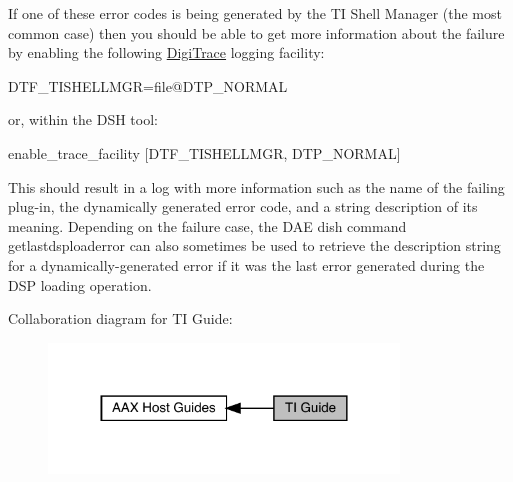If one of these error codes is being generated by the TI Shell Manager (the most common case) then you should be able to get more information about the failure by enabling the following \mbox{\hyperlink{a00834}{Digi\+Trace}} logging facility\+:

{\ttfamily D\+T\+F\+\_\+\+T\+I\+S\+H\+E\+L\+L\+M\+GR=file@D\+T\+P\+\_\+\+N\+O\+R\+M\+AL}

or, within the D\+SH tool\+:

{\ttfamily enable\+\_\+trace\+\_\+facility \mbox{[}D\+T\+F\+\_\+\+T\+I\+S\+H\+E\+L\+L\+M\+GR, D\+T\+P\+\_\+\+N\+O\+R\+M\+AL\mbox{]}}

This should result in a log with more information such as the name of the failing plug-\/in, the dynamically generated error code, and a string description of its meaning. Depending on the failure case, the D\+AE dish command {\ttfamily getlastdsploaderror} can also sometimes be used to retrieve the description string for a dynamically-\/generated error if it was the last error generated during the D\+SP loading operation.

 Collaboration diagram for TI Guide\+:
\nopagebreak
\begin{figure}[H]
\begin{center}
\leavevmode
\includegraphics[width=264pt]{a00832}
\end{center}
\end{figure}
